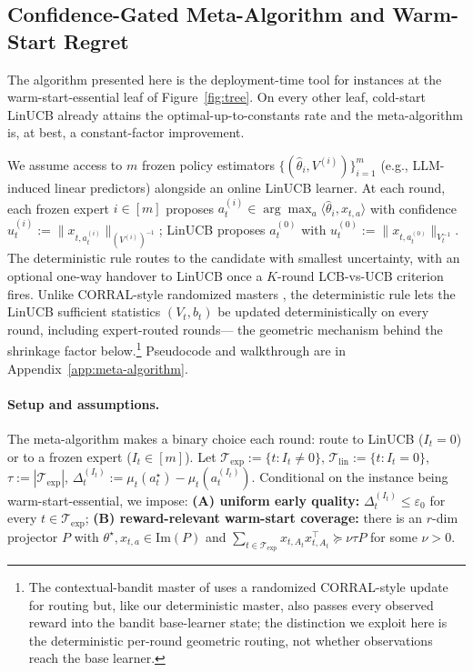 \documentclass{article}
\theoremstyle{definition}
\theoremstyle{remark}
\theoremstyle{remark}
\begin{document}
\subsection{Confidence-Gated Meta-Algorithm and Warm-Start Regret}
\label{sec:master-multiple}

The algorithm presented here is the deployment-time tool for instances at
the warm-start-essential leaf of Figure~\ref{fig:tree}. On every other leaf,
cold-start LinUCB already attains the optimal-up-to-constants rate and the
meta-algorithm is, at best, a constant-factor improvement.

We assume access to $m$ frozen policy estimators
$\{(\widehat\theta_i,V^{(i)})\}_{i=1}^m$ (e.g., LLM-induced linear predictors)
alongside an online LinUCB learner. At each round, each frozen expert
$i\!\in\![m]$ proposes $a_t^{(i)}\!\in\!\arg\max_a\langle\widehat\theta_i,x_{t,a}\rangle$
with confidence
$u_t^{(i)}\!:=\!\|x_{t,a_t^{(i)}}\|_{(V^{(i)})^{-1}}$; LinUCB proposes
$a_t^{(0)}$ with $u_t^{(0)}\!:=\!\|x_{t,a_t^{(0)}}\|_{V_t^{-1}}$. The
deterministic rule routes to the candidate with smallest uncertainty, with
an optional one-way handover to LinUCB once a $K$-round LCB-vs-UCB criterion
fires. Unlike CORRAL-style randomized masters \cite{agarwal2017corralling},
the deterministic rule lets the LinUCB sufficient statistics $(V_t,b_t)$ be
updated deterministically on every round, including expert-routed rounds---
the geometric mechanism behind the shrinkage factor below.\footnote{The
contextual-bandit master of \cite{chen2024llmdecision} uses a randomized
CORRAL-style update for routing but, like our deterministic master, also
passes every observed reward into the bandit base-learner state; the
distinction we exploit here is the deterministic per-round geometric routing,
not whether observations reach the base learner.} Pseudocode and walkthrough
are in Appendix~\ref{app:meta-algorithm}.

\paragraph{Setup and assumptions.}
The meta-algorithm makes a binary choice each round: route to LinUCB
($I_t=0$) or to a frozen expert ($I_t\!\in\![m]$). Let
$\mathcal T_{\mathrm{exp}}\!:=\!\{t:I_t\!\ne\!0\}$,
$\mathcal T_{\mathrm{lin}}\!:=\!\{t:I_t\!=\!0\}$,
$\tau\!:=\!|\mathcal T_{\mathrm{exp}}|$,
$\Delta_t^{(I_t)}\!:=\!\mu_t(a_t^\star)-\mu_t(a_t^{(I_t)})$. Conditional on
the instance being warm-start-essential, we impose:
\textbf{(A) uniform early quality:} $\Delta_t^{(I_t)}\!\le\!\varepsilon_0$
for every $t\!\in\!\mathcal T_{\mathrm{exp}}$;
\textbf{(B) reward-relevant warm-start coverage:} there is an $r$-dim
projector $P$ with $\theta^\star,x_{t,a}\!\in\!\mathrm{Im}(P)$ and
$\sum_{t\in\mathcal T_{\mathrm{exp}}}x_{t,A_t}x_{t,A_t}^\top\!\succeq\!\nu\tau P$
for some $\nu>0$.
\end{document}
